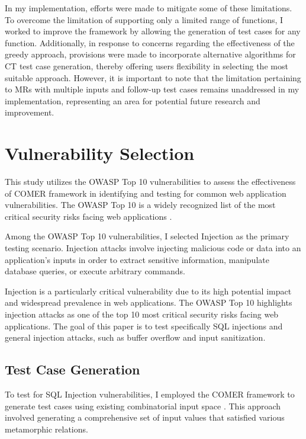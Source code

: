 In my implementation, efforts were made to mitigate some of these limitations.
To overcome the limitation of supporting only a limited range of functions, I worked to improve the framework by allowing the generation of test cases for any function.
Additionally, in response to concerns regarding the effectiveness of the greedy approach, provisions were made to incorporate alternative algorithms for CT test case generation, thereby offering users flexibility in selecting the most suitable approach.
However, it is important to note that the limitation pertaining to MRs with multiple inputs and follow-up test cases remains unaddressed in my implementation, representing an area for potential future research and improvement.

\section{Vulnerability Selection}\label{sec:vulnerability-selection}

This study utilizes the OWASP Top 10 vulnerabilities to assess the effectiveness of COMER framework in identifying and testing for common web application vulnerabilities. The OWASP Top 10 is a widely recognized list of the most critical security risks facing web applications \cite{OWASP}. 

Among the OWASP Top 10 vulnerabilities, I selected Injection as the primary testing scenario. Injection attacks involve injecting malicious code or data into an application's inputs in order to extract sensitive information, manipulate database queries, or execute arbitrary commands.

Injection is a particularly critical vulnerability due to its high potential impact and widespread prevalence in web applications. The OWASP Top 10 highlights injection attacks as one of the top 10 most critical security risks facing web applications. The goal of this paper is to test specifically SQL injections and general injection attacks, such as buffer overflow and input sanitization. 

\subsection{Test Case Generation}\label{sec:test-case-generation}

To test for SQL Injection vulnerabilities, I employed the COMER framework to generate test cases using existing combinatorial input space \cite{SQLInjection}. This approach involved generating a comprehensive set of input values that satisfied various metamorphic relations.

